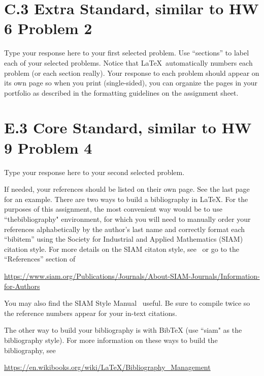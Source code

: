 \documentclass{article}
\newcommand\blankpage{
    \null
    \thispagestyle{empty}
    \addtocounter{page}{-1}
    \newpage
    }
\begin{document}
\section{C.3 Extra Standard, similar to HW 6 Problem 2}
Type your response here to your first selected problem. Use ``sections'' to label each of your selected problems. Notice that \LaTeX \ automatically numbers each problem (or each section really). Your response to each problem should appear on its own page so when you print (single-sided), you can organize the pages in your portfolio as described in the formatting guidelines on the assignment sheet. 

\afterpage{\blankpage}	%



\newpage

\section{E.3 Core Standard, similar to HW 9 Problem 4}
Type your response here to your second selected problem. 

\afterpage{\blankpage}	%





\newpage

If needed, your references should be listed on their own page. See the last page for an example. There are two ways to build a bibliography in \LaTeX. For the purposes of this assignment, the most convenient way would be to use ``thebibliography" environment, for which you will need to manually order your references alphabetically by the author's last name and correctly format each ``bibitem'' using the Society for Industrial and Applied Mathematics (SIAM) citation style. For more details on the SIAM citaton style, see~\cite[References]{siam_cite} or go to the ``References'' section of
\begin{center}
\url{https://www.siam.org/Publications/Journals/About-SIAM-Journals/Information-for-Authors}
\end{center}
You may also find the SIAM Style Manual~\cite[pp. 88-93]{siam_style} useful. Be sure to compile twice so the reference numbers appear for your in-text citations.

The other way to build your bibliography is with BibTeX (use ``siam" as the bibliography style). For more information on these ways to build the bibliography, see
\begin{center}
\url{https://en.wikibooks.org/wiki/LaTeX/Bibliography_Management}
\end{center}
\end{document}
